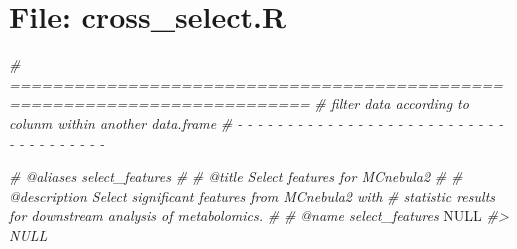 \documentclass[
]{article}
\newenvironment{Shaded}{\begin{snugshade}}{\end{snugshade}}
\newcommand{\CommentTok}[1]{\textcolor[rgb]{0.56,0.35,0.01}{\textit{#1}}}
\newcommand{\ConstantTok}[1]{\textcolor[rgb]{0.00,0.00,0.00}{#1}}
\begin{document}
\hypertarget{file-cross_select.r}{%
\section{File: cross\_select.R}\label{file-cross_select.r}}

\begin{Shaded}
\begin{Highlighting}[]
\CommentTok{\# ==========================================================================}
\CommentTok{\# filter data according to colunm within another data.frame}
\CommentTok{\# {-} {-} {-} {-} {-} {-} {-} {-} {-} {-} {-} {-} {-} {-} {-} {-} {-} {-} {-} {-} {-} {-} {-} {-} {-} {-} {-} {-} {-} {-} {-} {-} {-} {-} {-} {-} {-}}

\CommentTok{\#\textquotesingle{} @aliases select\_features}
\CommentTok{\#\textquotesingle{}}
\CommentTok{\#\textquotesingle{} @title Select \textquotesingle{}features\textquotesingle{} for MCnebula2}
\CommentTok{\#\textquotesingle{}}
\CommentTok{\#\textquotesingle{} @description Select significant \textquotesingle{}features\textquotesingle{} from MCnebula2 with}
\CommentTok{\#\textquotesingle{} statistic results for downstream analysis of metabolomics.}
\CommentTok{\#\textquotesingle{}}
\CommentTok{\#\textquotesingle{} @name select\_features}
\ConstantTok{NULL}
\CommentTok{\#\textgreater{} NULL}


\end{Highlighting}
\end{Shaded}
\end{document}
